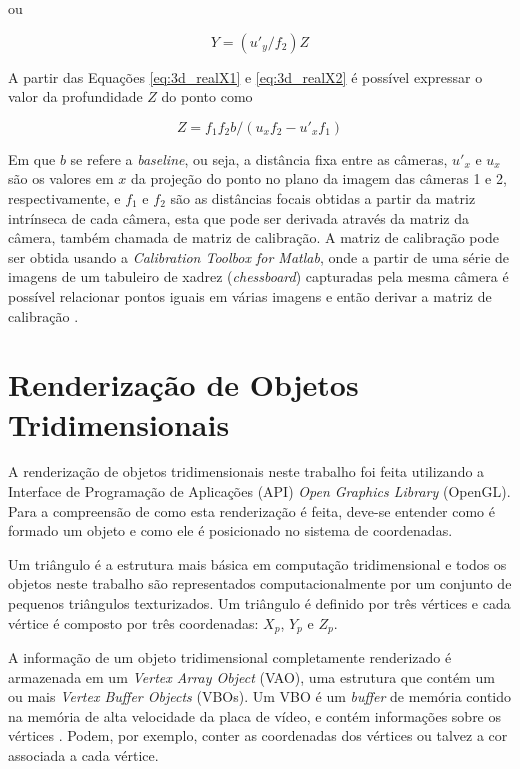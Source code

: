 {ou

\begin{equation}
Y = (u'_y/f_2) Z
\label{eq:3d_realY2}
\end{equation}  


A partir das Equações \ref{eq:3d_realX1} e \ref{eq:3d_realX2} é possível
expressar o valor da profundidade $Z$ do ponto como

\begin{equation}
Z = f_1  f_2  b / (u_x  f_2 - u'_x  f_1)
\label{eq:3d_Zequation}
\end{equation}


Em que $b$ se refere a \textit{baseline}, ou seja, a distância fixa entre as
câmeras, $u'_x$ e $u_x$ são os valores em $x$ da projeção do ponto no plano da
imagem das câmeras 1 e 2, respectivamente, e $f_1$ e $f_2$ são as distâncias
focais obtidas a partir da matriz intrínseca de cada câmera, esta que pode ser
derivada através da matriz da câmera, também chamada de matriz de calibração. A
matriz de calibração pode ser obtida usando a \textit{Calibration Toolbox for
Matlab}, onde a partir de uma série de imagens de um tabuleiro de xadrez
(\textit{chessboard}) capturadas pela mesma câmera é possível relacionar pontos
iguais em várias imagens e então derivar a matriz de calibração
\cite{bouguetML}.

\section{Renderização de Objetos Tridimensionais}

A renderização de objetos tridimensionais neste trabalho foi feita utilizando a
 Interface de
Programação de Aplicações (API)  \textit{Open Graphics Library} (OpenGL). Para a compreensão de como
esta renderização é feita, deve-se entender como é formado um objeto e como ele
é posicionado no sistema de coordenadas. 

Um triângulo é a estrutura mais básica em computação tridimensional
\cite{openGlWikibooks} e todos os objetos neste trabalho são representados
computacionalmente por um conjunto de pequenos triângulos texturizados. Um
triângulo é definido por três vértices e cada vértice é composto por três
coordenadas: $X_p$, $Y_p$ e $Z_p$.

A informação de um objeto tridimensional completamente renderizado é armazenada
em um  \textit{Vertex Array
Object} (VAO), uma estrutura que contém um ou mais
 \textit{Vertex Buffer Objects}
(VBOs). Um VBO é um \textit{buffer} de memória contido na memória de alta
velocidade da placa de vídeo, e contém informações sobre os vértices
\cite{openGlOrg}. Podem, por exemplo, conter as coordenadas dos vértices ou
talvez a cor associada a cada vértice.

}
